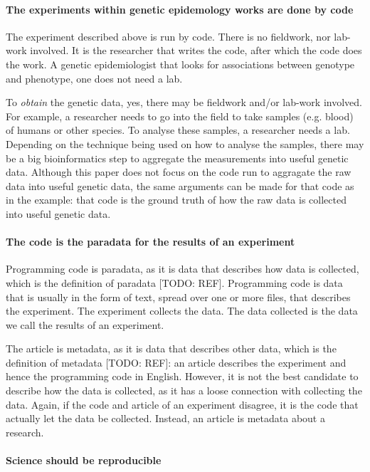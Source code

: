 \paragraph{The experiments within genetic epidemology works are done by code}

The experiment described above is run by code. There is no fieldwork,
nor lab-work involved. It is the researcher that writes the code,
after which the code does the work. A genetic epidemiologist that
looks for associations between genotype and phenotype,
one does not need a lab.

To \emph{obtain} the genetic data, yes, there may be fieldwork and/or lab-work
involved. For example, a researcher needs to go into the field to take
samples (e.g. blood) of humans or other species. To analyse these samples,
a researcher needs a lab. Depending on the technique being used on
how to analyse the samples, there may be a big bioinformatics step
to aggregate the measurements into useful genetic data. 
Although this paper does not focus on the code run to 
aggragate the raw data into useful genetic data, the same arguments
can be made for that code as in the example: that code is 
the ground truth of how the raw data is collected into useful genetic data.

\paragraph{The code is the paradata for the results of an experiment}

Programming code is paradata, as it is data that describes how data is collected,
which is the definition of paradata [TODO: REF].
Programming code is data that is usually in the form of text, 
spread over one or more files, that describes the experiment.
The experiment collects the data.
The data collected is the data we call the results of an experiment.

The article is metadata, as it is data that describes other
data, which is the definition of metadata [TODO: REF]:
an article describes the
experiment and hence the programming
code in English. However, it is not the best
candidate to describe how the data is collected,
as it has a loose connection with collecting the data.
Again, if the code and article of an experiment disagree,
it is the code that actually let the data be collected.  
Instead, an article is metadata about a research.

\paragraph{Science should be reproducible}

